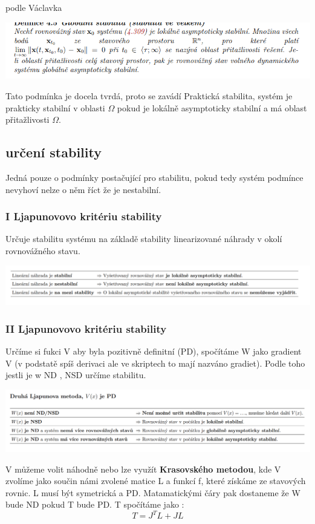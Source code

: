 podle Václavka

\includegraphics{img/vaclavek.golbal.png}

Tato podmínka je docela tvrdá, proto se zavádí Praktická stabilita, systém je prakticky stabilní v oblasti $\Omega$ pokud je lokálně asymptoticky stabilní a má oblast přitažlivosti $\Omega$.

\subsection*{určení stability}
Jedná pouze o podmínky postačující pro stabilitu, pokud tedy systém podmínce nevyhoví nelze o něm říct že je nestabilní.
\subsubsection{I Ljapunovovo kritériu stability}
Určuje stabilitu systému na základě stability linearizované náhrady v okolí rovnovážného stavu.

\noindent \includegraphics[scale = 0.6]{img/Ljap.1.png}

\subsubsection{II Ljapunovovo kritériu stability}
Určíme si fukci V aby byla pozitivně
 definitní (PD), spočítáme W jako gradient V (v podstatě spíš derivaci ale ve skriptech to mají nazváno gradiet). Podle toho jestli je w ND , NSD určíme stabilitu.

\includegraphics[scale = 0.6]{img/Ljap.2.png}

V můžeme volit náhodně nebo lze využít {\bf Krasovského metodou}, kde V zvolíme jako součin námi zvolené matice L a funkcí f, které získáme ze stavových rovnic.
L musí být symetrická a PD. Matamatickými čáry pak dostaneme že W bude ND pokud T bude PD.
T spočítáme jako :
\begin{equation*}
    T=J^TL+JL
\end{equation*}

